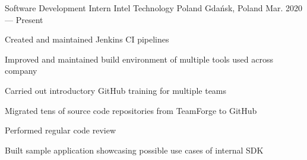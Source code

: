 

\begin{cventries}

  \cventry
    {Software Development Intern} %
    {Intel Technology Poland} %
    {Gdańsk, Poland} %
    {Mar. 2020 --- Present} %
    {
      \begin{cvitems} %
        \item {Created and maintained Jenkins CI pipelines}
        \item {Improved and maintained build environment of multiple tools used across company}
        \item {Carried out introductory GitHub training for multiple teams}
        \item {Migrated tens of source code repositories from TeamForge to GitHub}
        \item {Performed regular code review}
        \item {Built sample application showcasing possible use cases of internal SDK}
      \end{cvitems}
    }
\end{cventries}

